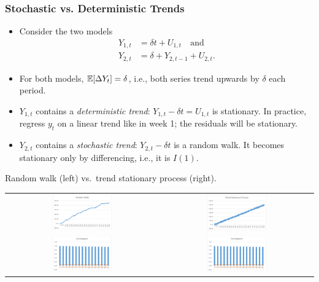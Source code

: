 \begin{frame}%
\frametitle{Stochastic vs. Deterministic Trends}

\begin{itemize}
\item Consider the two models
\begin{align*}
Y_{1,t}&=\delta t+U_{1,t} \quad\mbox{and}\\
Y_{2,t}&=\delta + Y_{2,t-1}+U_{2,t}.
\end{align*}
\item For both models, $\mathbb {{\mathbb E}}[\Delta Y_t]=\delta$, i.e., both series trend upwards by $\delta$ each period.
\item $Y_{1,t}$ contains a \emph{\color{red}deterministic trend}: $Y_{1,t}-\delta t=U_{1,t}$ is stationary. In practice, regress $y_t$ on a linear trend like in week 1; the residuals will be stationary.
\item $Y_{2,t}$ contains a \emph{\color{red}stochastic trend}: $Y_{2,t}-\delta t$ is a random walk. It becomes stationary only by differencing, i.e., it is $I(1).$
\end{itemize}

\end{frame}

\begin{frame}
\begin{block}{Random walk (left) vs.\ trend stationary process (right).}
\begin{tabular}{cc}
\includegraphics[width=0.4\textwidth]{rw1} & \includegraphics[width=0.4\textwidth]{ts1}\\
\includegraphics[width=0.4\textwidth]{rw2} & \includegraphics[width=0.4\textwidth]{ts2}
\end{tabular}
\end{block}
\end{frame}

